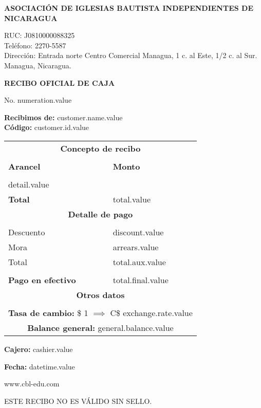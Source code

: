 \documentclass[11pt]{article}
\newcommand{\thenumber}{numeration.value}
\newcommand{\customerName}{customer.name.value}
\newcommand{\customerId}{customer.id.value}
\newcommand{\detail}{detail.value}
\newcommand{\total}{total.value}
\newcommand{\discountTotal}{discount.value}
\newcommand{\arrearsTotal}{arrears.value}
\newcommand{\auxTotal}{total.aux.value}
\newcommand{\finalTotal}{total.final.value}
\newcommand{\cashier}{cashier.value}
\newcommand{\datetime}{datetime.value}
\newcommand{\exchangeRate}{exchange.rate.value}
\newcommand{\generalBalance}{general.balance.value}
\begin{document}
    \begin{center}
        \textbf{ASOCIACIÓN DE IGLESIAS BAUTISTA INDEPENDIENTES DE NICARAGUA}\par
        {
            \small
            RUC: J0810000088325\\
            Teléfono: 2270-5587\\
            Dirección: Entrada norte Centro Comercial Managua, 1 c. al Este, 1/2 c. al Sur. Managua, Nicaragua.\par
        }
        \textbf{RECIBO OFICIAL DE CAJA}\par
        No. \thenumber
    \end{center}
    \textbf{Recibimos de:} \customerName\\
    \textbf{Código:} \customerId

    \begin{longtable}{p{3.8cm} p{1.8cm}}
        \hline
        \multicolumn{2}{c}{\textbf{Concepto de recibo}} \\\\
        \textbf{Arancel} & \textbf{Monto} \\\\
        \detail\\
        \textbf{Total} & \total\\
        \hline
        \multicolumn{2}{c}{\textbf{Detalle de pago}} \\\\
        Descuento & \discountTotal\\
        Mora & \arrearsTotal\\
        Total & \auxTotal\\\\
        \textbf{Pago en efectivo} & \finalTotal\\
        \hline
        \multicolumn{2}{c}{\textbf{Otros datos}}\\\\
        \multicolumn{2}{c}{\textbf{Tasa de cambio:} \$ 1 $\implies$ C\$ \exchangeRate}\\
        \multicolumn{2}{c}{\textbf{Balance general:} \generalBalance}
    \end{longtable}
    
    \textbf{Cajero:} \cashier\par
    \textbf{Fecha:} \datetime
    \begin{center}
        www.cbl-edu.com\par
        ESTE RECIBO NO ES VÁLIDO SIN SELLO.
    \end{center}
\end{document}
